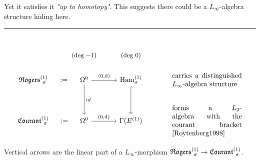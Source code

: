 \documentclass[beamer,10pt]{standalone}
\newcommand{\seprule}{\par\noindent\rule{.4\textwidth}{0.4pt}\\
}
\begin{document}
\begin{frame}
	Yet it satisfies it \emph{"up to homotopy"}. This suggests there could be a $L_\infty$-algebra structure hiding here.
	\vfill

	\seprule
	\begin{displaymath}
		\begin{tikzcd}[ampersand replacement=\&]
			\& \text{\small (deg $-1$)} \& \text{\small (deg $0$)} \\[-.5em]
			\Rogers[\sigma]{1}   \ar[r,phantom,":="]
			\&
			\Omega^0 \ar[r,"{(0,\d)}"] \ar[d,"id"]
			\& \Ham_{\sigma}^{(1)} \ar[d,hook]
			\&[1em] \parbox{10em}{carries a distinguished $L_\infty$-algebra structure}
			\\
			\Courant[\sigma]{1} \ar[r,phantom,":="]
			\& \Omega^0 \ar[r,"{(0,\d)}"]
			\& \Gamma(E^{(1)}) \&
			\parbox{10em}{forms a $L_2$-algebra with the courant bracket \cite{Roytenberg1998}}
		\end{tikzcd}
	\end{displaymath}
	\vfill

	Vertical arrows are the linear part of a $L_\infty$-morphism $\Rogers[\sigma]{1} \to \Courant[\sigma]{1}$.
\end{frame}
\end{document}
